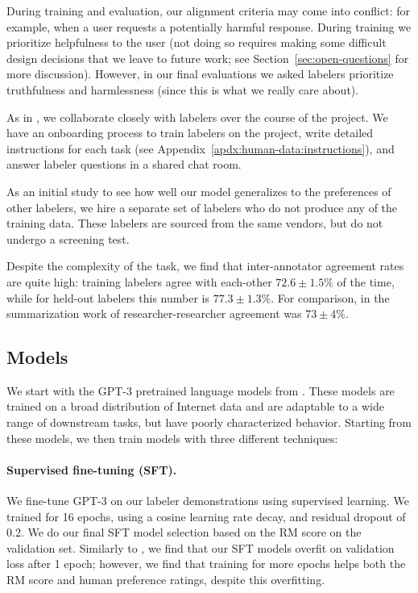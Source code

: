 \documentclass{article}
\begin{document}
During training and evaluation, our alignment criteria may come into conflict: for example, when a user requests a potentially harmful response. During training we prioritize helpfulness to the user (not doing so requires making some difficult design decisions that we leave to future work; see Section~\ref{sec:open-questions} for more discussion). However, in our final evaluations we asked labelers prioritize truthfulness and harmlessness (since this is what we really care about). 

As in \citet{stiennon2020learning}, we collaborate closely with labelers over the course of the project. We have an onboarding process to train labelers on the project, write detailed instructions for each task (see Appendix~\ref{apdx:human-data:instructions}), and answer labeler questions in a shared chat room.

As an initial study to see how well our model generalizes to the preferences of other labelers, we hire a separate set of labelers who do not produce any of the training data. These labelers are sourced from the same vendors, but do not undergo a screening test. 

Despite the complexity of the task, we find that inter-annotator agreement rates are quite high: training labelers agree with each-other $72.6 \pm 1.5\%$ of the time, while for held-out labelers this number is $77.3 \pm 1.3\%$. For comparison, in the summarization work of \citet{stiennon2020learning} researcher-researcher agreement was $73 \pm 4\%$.


\subsection{Models}
\label{sec:models}

We start with the GPT-3 pretrained language models from \citet{brown2020language}. These models are trained on a broad distribution of Internet data and are adaptable to a wide range of downstream tasks, but have poorly characterized behavior. Starting from these models, we then train models with three different techniques:

\paragraph{Supervised fine-tuning (SFT).} We fine-tune GPT-3 on our labeler demonstrations using supervised learning.  We trained for 16 epochs, using a cosine learning rate decay, and residual dropout of 0.2. We do our final SFT model selection based on the RM score on the validation set. Similarly to \citet{wu2021recursively}, we find that our SFT models overfit on validation loss after 1 epoch; however, we find that training for more epochs helps both the RM score and human preference ratings, despite this overfitting.
\end{document}
